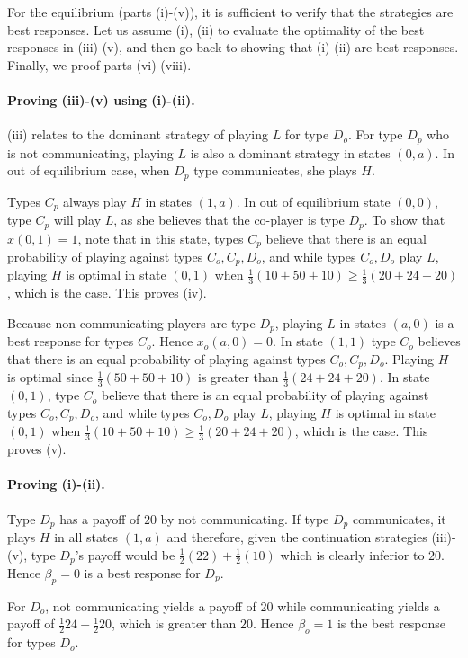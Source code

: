 \documentclass[12pt]{article}
\theoremstyle{break}
\begin{document}
For the equilibrium (parts (i)-(v)), it is sufficient to verify that the strategies are best responses. Let us assume (i), (ii) to evaluate the optimality of the best responses in (iii)-(v), and then go back to showing that (i)-(ii) are best responses. Finally, we proof parts (vi)-(viii).

\paragraph{Proving (iii)-(v) using (i)-(ii).} (iii) relates to the dominant strategy of playing $L$ for type $D_o$. For type $D_p$ who is not communicating, playing $L$ is also a dominant strategy in states $(0,a)$. In out of equilibrium case, when $D_p$ type communicates, she plays $H$.

Types $C_p$ always play $H$ in states $(1,a)$. In out of equilibrium state $(0,0)$, type $C_p$ will play $L$, as she believes that the co-player is type $D_p$. To show that $x(0,1)=1$, note that in this state, types $C_p$ believe that there is an equal probability of playing against types $C_o,C_p,D_o$, and while types $C_o,D_o$ play $L$, playing $H$ is optimal in state $(0,1)$ when $\frac{1}{3}(10+50+10)\geq \frac{1}{3}(20+24+20)$, which is the case. This proves (iv).

Because non-communicating players are type $D_p$, playing $L$ in states $(a,0)$ is a best response for types $C_o$. Hence $x_o(a,0)=0$. In state $(1,1)$ type $C_o$ believes that there is an equal probability of playing against types $C_o,C_p,D_o$. Playing $H$ is optimal since $\frac{1}{3}(50+50+10)$ is greater than $\frac{1}{3}(24+24+20)$. In state $(0,1)$, type $C_o$ believe that there is an equal probability of playing against types $C_o,C_p,D_o$, and while types $C_o,D_o$ play $L$, playing $H$ is optimal in state $(0,1)$ when $\frac{1}{3}(10+50+10)\geq \frac{1}{3}(20+24+20)$, which is the case. This proves (v).

\paragraph{Proving (i)-(ii).} Type $D_p$ has a payoff of $20$ by not communicating. If type $D_p$ communicates, it plays $H$ in all states $(1,a)$ and therefore, given the continuation strategies (iii)-(v), type $D_p$'s payoff would be $\frac{1}{2}(22)+\frac{1}{2}(10)$ which is clearly inferior to $20$. Hence $\beta_p=0$ is a best response for $D_p$.

For $D_o$, not communicating yields a payoff of $20$ while communicating yields a payoff of $\frac{1}{2}24+\frac{1}{2}20$, which is greater than $20$. Hence $\beta_o=1$ is the best response for types $D_o$.
\end{document}
